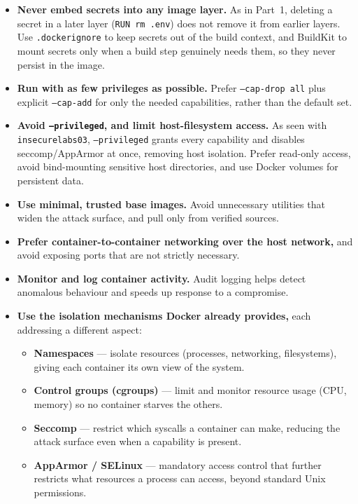 \documentclass[11pt,a4paper]{article}
\begin{document}
\begin{itemize}[nosep]
    \item \textbf{Never embed secrets into any image layer.} As in Part~1, deleting a secret in a later layer (\texttt{RUN rm .env}) does not remove it from earlier layers. Use \texttt{.dockerignore} to keep secrets out of the build context, and BuildKit to mount secrets only when a build step genuinely needs them, so they never persist in the image.
    \item \textbf{Run with as few privileges as possible.} Prefer \texttt{--cap-drop all} plus explicit \texttt{--cap-add} for only the needed capabilities, rather than the default set.
    \item \textbf{Avoid \texttt{--privileged}, and limit host-filesystem access.} As seen with \texttt{insecurelabs03}, \texttt{--privileged} grants every capability and disables seccomp/AppArmor at once, removing host isolation. Prefer read-only access, avoid bind-mounting sensitive host directories, and use Docker volumes for persistent data.
    \item \textbf{Use minimal, trusted base images.} Avoid unnecessary utilities that widen the attack surface, and pull only from verified sources.
    \item \textbf{Prefer container-to-container networking over the host network,} and avoid exposing ports that are not strictly necessary.
    \item \textbf{Monitor and log container activity.} Audit logging helps detect anomalous behaviour and speeds up response to a compromise.
    \item \textbf{Use the isolation mechanisms Docker already provides,} each addressing a different aspect:
    \begin{itemize}[nosep]
        \item \textbf{Namespaces} --- isolate resources (processes, networking, filesystems), giving each container its own view of the system.
        \item \textbf{Control groups (cgroups)} --- limit and monitor resource usage (CPU, memory) so no container starves the others.
        \item \textbf{Seccomp} --- restrict which syscalls a container can make, reducing the attack surface even when a capability is present.
        \item \textbf{AppArmor / SELinux} --- mandatory access control that further restricts what resources a process can access, beyond standard Unix permissions.
    \end{itemize}
\end{itemize}
\end{document}
